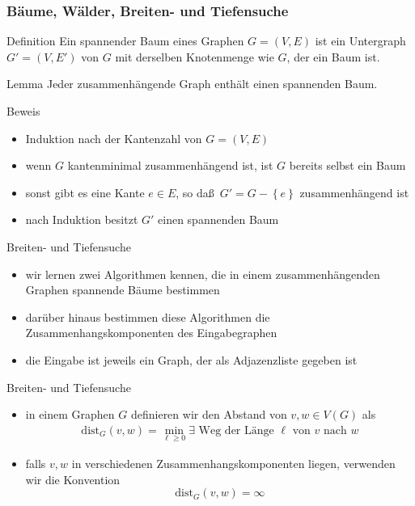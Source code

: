 \documentclass[aspectratio=1610, 11pt]{beamer}
\newcommand\dist{\mathrm{dist}}
\newcommand\cbc[1]{\left\{{#1}\right\}}
\newcommand{\mytitle}{B\"aume, W\"alder, Breiten- und Tiefensuche}
\begin{document}
\begin{frame}\frametitle{\mytitle}
	\begin{overprint}
		\begin{block}{Definition}
			Ein \alert{spannender Baum} eines Graphen $G=(V,E)$ ist ein Untergraph $G'=(V,E')$ von $G$ mit derselben Knotenmenge wie $G$, der ein Baum ist.
		\end{block}
		\begin{block}{Lemma}
			Jeder zusammenh\"angende Graph enth\"alt einen spannenden Baum.
		\end{block}
		\begin{exampleblock}{Beweis}
			\begin{itemize}
				\item Induktion nach der Kantenzahl von $G=(V,E)$
				\item wenn $G$ kantenminimal zusammenh\"angend ist, ist $G$ bereits selbst ein Baum
				\item sonst gibt es eine Kante $e\in E$, so da\ss\ $G'=G-\cbc e$ zusammenh\"angend ist
				\item nach Induktion besitzt $G'$ einen spannenden Baum
			\end{itemize}
		\end{exampleblock}
		\begin{exampleblock}{Breiten- und Tiefensuche}
			\begin{itemize}
				\item wir lernen zwei Algorithmen kennen, die in einem zusammenh\"angenden Graphen spannende B\"aume bestimmen
				\item dar\"uber hinaus bestimmen diese Algorithmen die Zusammenhangskomponenten des Eingabegraphen
				\item die Eingabe ist jeweils ein Graph, der als Adjazenzliste gegeben ist
			\end{itemize}
		\end{exampleblock}
		\begin{exampleblock}{Breiten- und Tiefensuche}
			\begin{itemize}
				\item in einem Graphen $G$ definieren wir den \alert{Abstand} von $v,w\in V(G)$ als
					\begin{align*}
						\dist_G(v,w)=\min_{\ell\geq0}\exists\mbox{ Weg der L\"ange $\ell$ von $v$ nach $w$}
					\end{align*}
				\item falls $v,w$ in verschiedenen Zusammenhangskomponenten liegen, verwenden wir die Konvention
					$$\dist_G(v,w)=\infty$$
			\end{itemize}
		\end{exampleblock}
	\end{overprint}
\end{frame}
\end{document}
